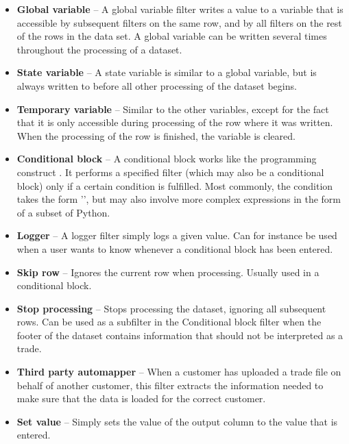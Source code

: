 \begin{itemize}
\item \textbf{Global variable} --
A global variable filter writes a value to a variable that is accessible by subsequent filters on the same row, and by all filters on the rest of the rows in the data
set. A global variable can be written several times throughout the processing of a dataset.

\item \textbf{State variable} --
A state variable is similar to a global variable, but is always written to before all other processing of the dataset begins.

\item \textbf{Temporary variable} --
Similar to the other variables, except for the fact that it is only accessible during processing of the row where it was written. When the 
processing of the row is finished, the variable is cleared.

\item \textbf{Conditional block} --
A conditional block works like the programming construct . It performs a specified filter (which may also be a conditional block) only if a certain
condition is fulfilled. Most commonly, the condition takes the form '', but may also involve more complex expressions in the form of a
subset of Python.

\item \textbf{Logger} --
A logger filter simply logs a given value. Can for instance be used when a user wants to know whenever a conditional block has been entered.

\item \textbf{Skip row} --
Ignores the current row when processing. Usually used in a conditional block.

\item \textbf{Stop processing} --
Stops processing the dataset, ignoring all subsequent rows. Can be used as a subfilter in the Conditional block filter when the footer of the dataset
contains information that should not be interpreted as a trade.

\item \textbf{Third party automapper} --
When a customer has uploaded a trade file on behalf of another customer, this filter extracts the information needed to make sure that the data is loaded
for the correct customer.

\item \textbf{Set value} --
Simply sets the value of the output column to the value that is entered.


\end{itemize}
